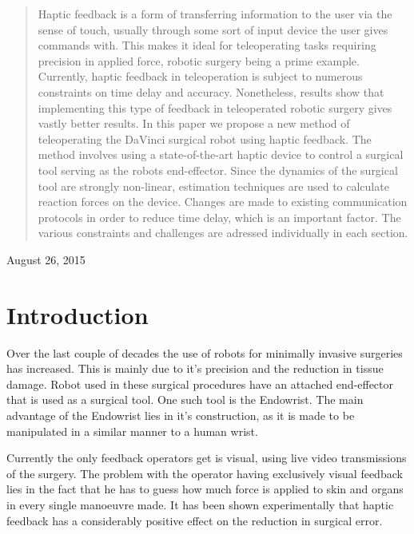\documentclass[conference]{IEEEtran}
\begin{document}
\begin{abstract}
Haptic feedback is a form of transferring information to the user via the sense of touch, usually through some sort of input device the user gives commands with.
This makes it ideal for teleoperating tasks requiring precision in applied force, robotic surgery being a prime example.
Currently, haptic feedback in teleoperation is subject to numerous constraints on time delay and accuracy.
Nonetheless, results show that implementing this type of feedback in teleoperated robotic surgery gives vastly better results.
In this paper we propose a new method of teleoperating the DaVinci surgical robot using haptic feedback.
The method involves using a state-of-the-art haptic device to control a surgical tool serving as the robots end-effector.
Since the dynamics of the surgical tool are strongly non-linear, estimation techniques are used to calculate reaction forces on the device.
Changes are made to existing communication protocols in order to reduce time delay, which is an important factor.
The various constraints and challenges are adressed individually in each section.
\end{abstract}
\hfill August 26, 2015



%
\IEEEpeerreviewmaketitle

\section{Introduction}
Over the last couple of decades the use of robots for minimally invasive surgeries has increased.
This is mainly due to it's precision and the reduction in tissue damage\cite{RIGSP}.
Robot used in these surgical procedures have an attached end-effector that is used as a surgical tool.
One such tool is the Endowrist. 
The main advantage of the Endowrist lies in it's construction, as it is made to be manipulated in a similar manner to a human wrist.

Currently the only feedback operators get is visual, using live video transmissions of the surgery. 
The problem with the operator having exclusively visual feedback lies in the fact that he has to guess how much force is applied to skin and organs in every single manoeuvre made. 
It has been shown experimentally that haptic feedback has a considerably positive effect on the reduction in surgical error\cite{EOFGFF}. 
\end{document}
